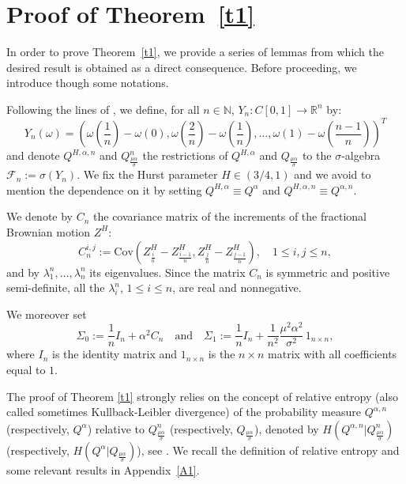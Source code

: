 \documentclass[reqno,a4paper]{amsart}
\theoremstyle{plain}
\theoremstyle{definition}
\theoremstyle{plain}
\theoremstyle{plain}
\theoremstyle{plain}
\begin{document}
\section{Proof of Theorem~\ref{t1}}\label{S2}
In order to prove Theorem~\ref{t1}, we provide a series of lemmas from which the desired result is obtained as a direct consequence. Before proceeding, we introduce though some notations.

Following the lines of \cite{Ch,Ch1}, we define, for all $n\in{{\mathbb N}}$, $Y_n:C[0,1]\rightarrow{{\mathbb R}}^n$ by:
$$Y_n(\omega)=\left(\omega\left(\frac1{n}\right)-\omega(0),\omega\left(\frac2{n}\right)-\omega\left(\frac1{n}\right),\ldots,\omega(1)-\omega\left(\frac{n-1}n\right)\right)^T$$
and denote $Q^{H,\alpha,n}$ and $Q_{\frac{\mu\alpha}{\sigma}}^n$ the restrictions of $Q^{H,\alpha}$ and $Q_{\frac{\mu\alpha}{\sigma}}$ to the $\sigma$-algebra ${{\mathcal F}}_n:=\sigma(Y_n)$.
We fix the Hurst parameter $H\in(3/4,1)$ and we avoid to mention the dependence on it by setting $Q^{H,\alpha}\equiv Q^{\alpha}$ and $Q^{H,\alpha,n}\equiv Q^{\alpha,n}$.

We denote by $C_n$ the covariance matrix of the increments of the fractional Brownian motion $Z^H$:
$$C_n^{i,j}:=\textrm{Cov}\left(Z_{\frac{i}{n}}^H-Z_{\frac{i-1}{n}}^H,Z_{\frac{j}{n}}^H-Z_{\frac{j-1}{n}}^H\right),\quad 1\leq i,j\leq n,$$
and by $\lambda_1^n,\dots,\lambda_n^n$ its eigenvalues. Since the matrix $C_n$ is symmetric and positive semi-definite, all the $\lambda_i^n$, $1\leq i\leq n$, are real and nonnegative.

We moreover set
$$\Sigma_0:=\frac{1}{n}I_n+\alpha^2 C_n\quad\textrm{and}\quad \Sigma_1:=\frac{1}{n}I_n+\frac1{n^2} \frac{\mu^2\alpha^2}{\sigma^2}\,1_{n\times n},$$
where $I_n$ is the identity matrix and $1_{n\times n}$ is the $n\times n$ matrix with all coefficients equal to $1$.

The proof of Theorem \ref{t1} strongly relies on the concept of relative entropy (also called sometimes Kullback-Leibler divergence) of the probability measure $Q^{\alpha,n}$ (respectively, $Q^{\alpha}$) relative to $Q_{\frac{\mu\alpha}{\sigma}}^n$ (respectively, $Q_{\frac{\mu\alpha}{\sigma}}$), denoted by $H(Q^{\alpha,n}|Q_{\frac{\mu\alpha}{\sigma}}^n)$ (respectively, $H(Q^{\alpha}|Q_{\frac{\mu\alpha}{\sigma}})$), see \cite[Section 6]{Hihi}. We recall the definition of relative entropy and some relevant results in Appendix~\ref{A1}.
\end{document}
